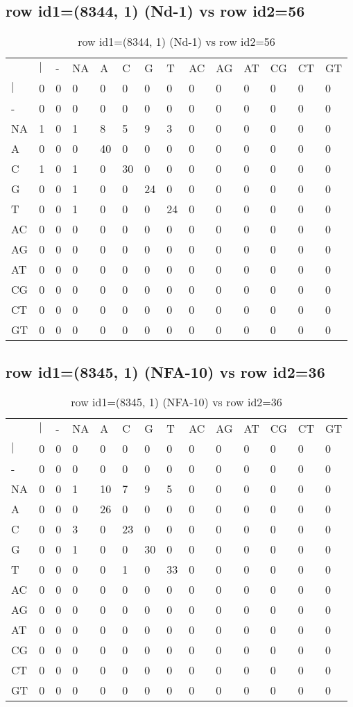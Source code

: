 \subsection{row id1=(8344, 1) (Nd-1) vs row id2=56}
\begin{center}
\begin{longtable}{|l|l|l|l|l|l|l|l|l|l|l|l|l|l|}
\caption{row id1=(8344, 1) (Nd-1) vs row id2=56} \label{table_dm554}\\
\hline
\\
\hline
&$|$&-&NA&A&C&G&T&AC&AG&AT&CG&CT&GT\\
$|$&0&0&0&0&0&0&0&0&0&0&0&0&0\\
-&0&0&0&0&0&0&0&0&0&0&0&0&0\\
NA&1&0&1&8&5&9&3&0&0&0&0&0&0\\
A&0&0&0&40&0&0&0&0&0&0&0&0&0\\
C&1&0&1&0&30&0&0&0&0&0&0&0&0\\
G&0&0&1&0&0&24&0&0&0&0&0&0&0\\
T&0&0&1&0&0&0&24&0&0&0&0&0&0\\
AC&0&0&0&0&0&0&0&0&0&0&0&0&0\\
AG&0&0&0&0&0&0&0&0&0&0&0&0&0\\
AT&0&0&0&0&0&0&0&0&0&0&0&0&0\\
CG&0&0&0&0&0&0&0&0&0&0&0&0&0\\
CT&0&0&0&0&0&0&0&0&0&0&0&0&0\\
GT&0&0&0&0&0&0&0&0&0&0&0&0&0\\
\hline
\end{longtable}
\end{center}

\subsection{row id1=(8345, 1) (NFA-10) vs row id2=36}
\begin{center}
\begin{longtable}{|l|l|l|l|l|l|l|l|l|l|l|l|l|l|}
\caption{row id1=(8345, 1) (NFA-10) vs row id2=36} \label{table_dm556}\\
\hline
\\
\hline
&$|$&-&NA&A&C&G&T&AC&AG&AT&CG&CT&GT\\
$|$&0&0&0&0&0&0&0&0&0&0&0&0&0\\
-&0&0&0&0&0&0&0&0&0&0&0&0&0\\
NA&0&0&1&10&7&9&5&0&0&0&0&0&0\\
A&0&0&0&26&0&0&0&0&0&0&0&0&0\\
C&0&0&3&0&23&0&0&0&0&0&0&0&0\\
G&0&0&1&0&0&30&0&0&0&0&0&0&0\\
T&0&0&0&0&1&0&33&0&0&0&0&0&0\\
AC&0&0&0&0&0&0&0&0&0&0&0&0&0\\
AG&0&0&0&0&0&0&0&0&0&0&0&0&0\\
AT&0&0&0&0&0&0&0&0&0&0&0&0&0\\
CG&0&0&0&0&0&0&0&0&0&0&0&0&0\\
CT&0&0&0&0&0&0&0&0&0&0&0&0&0\\
GT&0&0&0&0&0&0&0&0&0&0&0&0&0\\
\hline
\end{longtable}
\end{center}

